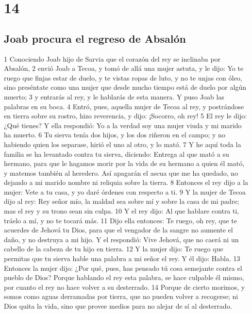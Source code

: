 \chapter{14}

\section*{Joab procura el regreso de Absalón}


1 Conociendo Joab hijo de Sarvia que el corazón del rey se inclinaba por Absalón,
2 envió Joab a Tecoa, y tomó de allá una mujer astuta, y le dijo: Yo te ruego que finjas estar de duelo, y te vistas ropas de luto, y no te unjas con óleo, sino preséntate como una mujer que desde mucho tiempo está de duelo por algún muerto;
3 y entrarás al rey, y le hablarás de esta manera. Y puso Joab las palabras en su boca.
4 Entró, pues, aquella mujer de Tecoa al rey, y postrándose en tierra sobre su rostro, hizo reverencia, y dijo: ¡Socorro, oh rey!
5 El rey le dijo: ¿Qué tienes? Y ella respondió: Yo a la verdad soy una mujer viuda y mi marido ha muerto.
6 Tu sierva tenía dos hijos, y los dos riñeron en el campo; y no habiendo quien los separase, hirió el uno al otro, y lo mató. 
7 Y he aquí toda la familia se ha levantado contra tu sierva, diciendo: Entrega al que mató a su hermano, para que le hagamos morir por la vida de su hermano a quien él mató, y matemos también al heredero. Así apagarán el ascua que me ha quedado, no dejando a mi marido nombre ni reliquia sobre la tierra.
8 Entonces el rey dijo a la mujer: Vete a tu casa, y yo daré órdenes con respecto a ti.
9 Y la mujer de Tecoa dijo al rey: Rey señor mío, la maldad sea sobre mí y sobre la casa de mi padre; mas el rey y su trono sean sin culpa.
10 Y el rey dijo: Al que hablare contra ti, tráelo a mí, y no te tocará más.
11 Dijo ella entonces: Te ruego, oh rey, que te acuerdes de Jehová tu Dios, para que el vengador de la sangre no aumente el daño, y no destruya a mi hijo. Y el respondió: Vive Jehová, que no caerá ni un cabello de la cabeza de tu hijo en tierra.
12 Y la mujer dijo: Te ruego que permitas que tu sierva hable una palabra a mi señor el rey. Y él dijo: Habla.
13 Entonces la mujer dijo: ¿Por qué, pues, has pensado tú cosa semejante contra el pueblo de Dios? Porque hablando el rey esta palabra, se hace culpable él mismo, por cuanto el rey no hace volver a su desterrado.
14 Porque de cierto morimos, y somos como aguas derramadas por tierra, que no pueden volver a recogerse; ni Dios quita la vida, sino que provee medios para no alejar de sí al desterrado.

